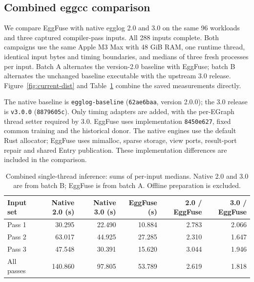 \subsection{Combined eggcc comparison}

We compare EggFuse with native egglog 2.0 and 3.0 on the same 96 workloads and three captured compiler-pass inputs. All 288 inputs complete. Both campaigns use the same Apple M3 Max with 48 GiB RAM, one runtime thread, identical input bytes and timing boundaries, and medians of three fresh processes per input. Batch A alternates the version-2.0 baseline with EggFuse; batch B alternates the unchanged baseline executable with the upstream 3.0 release. Figure~\ref{fig:current-dist} and Table~\ref{tab:current-suite} combine the saved measurements directly.

The native baseline is \texttt{egglog-baseline} (\texttt{62ae6baa}, version 2.0.0); the 3.0 release is \texttt{v3.0.0} (\texttt{8879605c}). Only timing adapters are added, with the per-EGraph thread setter required by 3.0. EggFuse uses implementation \texttt{8450e627}, fixed common training and the historical donor. The native engines use the default Rust allocator; EggFuse uses mimalloc, sparse storage, view ports, result-port repair and shared Entry publication. These implementation differences are included in the comparison.

\begin{table}[ht]\centering\small

\begin{tabular}{lrrrrr}\toprule Input set & Native 2.0 (s) & Native 3.0 (s) & EggFuse (s) & 2.0 / EggFuse & 3.0 / EggFuse\\\midrule

Pass 1 & 30.295 & 22.490 & 10.884 & 2.783 & 2.066\\

Pass 2 & 63.017 & 44.925 & 27.285 & 2.310 & 1.647\\

Pass 3 & 47.548 & 30.391 & 15.620 & 3.044 & 1.946\\

\midrule All passes & 140.860 & 97.805 & 53.789 & 2.619 & 1.818\\

\bottomrule\end{tabular}

\caption{Combined single-thread inference: sums of per-input medians. Native 2.0 and 3.0 are from batch B; EggFuse is from batch A. Offline preparation is excluded.}\label{tab:current-suite}\end{table}


